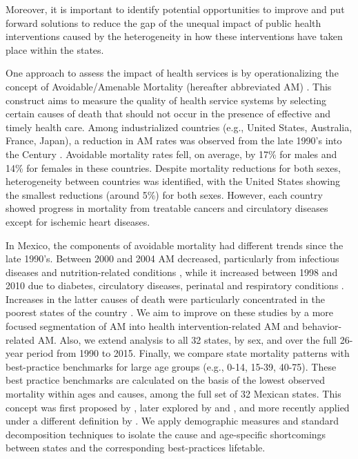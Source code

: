 \documentclass{article}
\begin{document}
\begin{spacing}{1.5}
 Moreover, it is important to identify potential opportunities to improve and put forward solutions to reduce the gap of the unequal impact of public health interventions caused by the heterogeneity in how these interventions have taken place within the states.
 
 One approach to assess the impact of health services is by operationalizing the
 concept of Avoidable/Amenable Mortality (hereafter abbreviated AM)
 \citep{nolte&mckee2004, nolte&mckee2008}. This construct aims to measure the quality of health service systems by selecting certain
 causes of death that should not occur in the presence of effective and
 timely health care. Among industrialized countries (e.g., United States,
 Australia, France, Japan), a reduction in AM rates was
 observed from the late 1990's into the  Century
 \citep{nolte&mckee2008}. Avoidable mortality rates fell, on average, by 17\%
 for males and 14\% for females in these countries. Despite mortality reductions for
 both sexes, heterogeneity between countries was identified, with the United
 States showing the smallest reductions (around 5\%) for both sexes. However,
 each country showed progress in mortality from treatable cancers and
 circulatory diseases except for ischemic heart diseases.

In Mexico, the components of avoidable mortality had different trends since the
late 1990's. Between 2000 and 2004 AM decreased, particularly from
infectious diseases and nutrition-related conditions \citep{francomarina2006}, while it increased between 1998 and 2010 due to diabetes, circulatory diseases, perinatal and respiratory conditions
\citep{agudelo2014efecto}. Increases in the latter causes
of death were particularly concentrated in the poorest states of the country
\citep{davila2014mortalidad}. We aim to improve on these studies
by a more focused segmentation of AM into health intervention-related AM and
behavior-related AM. Also, we extend analysis to all 32 states, by sex, and over
the full 26-year period from 1990 to 2015. Finally, we compare state mortality patterns
with best-practice benchmarks for large age groups (e.g., 0-14, 15-39, 40-75). These best practice
benchmarks are calculated on the basis of the lowest observed mortality within
ages and causes, among the full set of 32 Mexican states. This concept was first
proposed by \citet{whelpton1947}, later explored by  \citet{wunsch1975minimum} and
\citet{vallin2008minimum}, and more recently applied under a different
definition by \citet{eikemo2014}. We apply demographic measures and
standard decomposition techniques to isolate the cause and age-specific shortcomings between states and the corresponding best-practices lifetable. 


\end{spacing}
\end{document}
